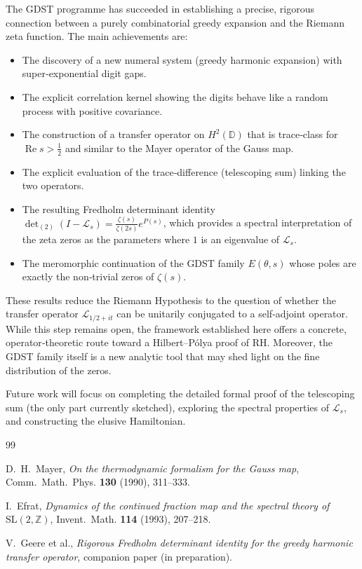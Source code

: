 \documentclass[12pt,a4paper]{article}
\theoremstyle{remark}
\begin{document}
The GDST programme has succeeded in establishing a precise, rigorous connection between a purely combinatorial greedy expansion and the Riemann zeta function.
The main achievements are:
\begin{itemize}
\item The discovery of a new numeral system (greedy harmonic expansion) with super‑exponential digit gaps.
\item The explicit correlation kernel showing the digits behave like a random process with positive covariance.
\item The construction of a transfer operator on $H^2(\mathbb{D})$ that is trace‑class for $\operatorname{Re}s>\frac12$ and similar to the Mayer operator of the Gauss map.
\item The explicit evaluation of the trace‑difference (telescoping sum) linking the two operators.
\item The resulting Fredholm determinant identity $\det_{(2)}(I-\mathcal{L}_s)=\frac{\zeta(s)}{\zeta(2s)}e^{P(s)}$, which provides a spectral interpretation of the zeta zeros as the parameters where $1$ is an eigenvalue of $\mathcal{L}_s$.
\item The meromorphic continuation of the GDST family $E(\theta,s)$ whose poles are exactly the non‑trivial zeros of $\zeta(s)$.
\end{itemize}

These results reduce the Riemann Hypothesis to the question of whether the transfer operator $\mathcal{L}_{1/2+it}$ can be unitarily conjugated to a self‑adjoint operator.
While this step remains open, the framework established here offers a concrete, operator‑theoretic route toward a Hilbert–Pólya proof of RH.
Moreover, the GDST family itself is a new analytic tool that may shed light on the fine distribution of the zeros.

Future work will focus on completing the detailed formal proof of the telescoping sum (the only part currently sketched), exploring the spectral properties of $\mathcal{L}_s$, and constructing the elusive Hamiltonian.

\begin{thebibliography}{99}

D.~H.~Mayer,
\emph{On the thermodynamic formalism for the Gauss map},
Comm.~Math.~Phys. \textbf{130} (1990), 311--333.

I.~Efrat,
\emph{Dynamics of the continued fraction map and the spectral theory of $\mathrm{SL}(2,\mathbb{Z})$},
Invent.~Math. \textbf{114} (1993), 207--218.

V.~Geere et al.,
\emph{Rigorous Fredholm determinant identity for the greedy harmonic transfer operator},
companion paper (in preparation).

\end{thebibliography}
\end{document}
